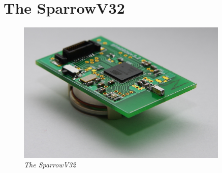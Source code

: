\clearpage

\section{The SparrowV32}

\begin{figure}[ht]
\begin{center}
\includegraphics[width=0.9\textwidth]{hw_platform/Sparrowv32.jpg}
\end{center}
\caption{\small \itshape{The SparrowV32}}
\end{figure}
